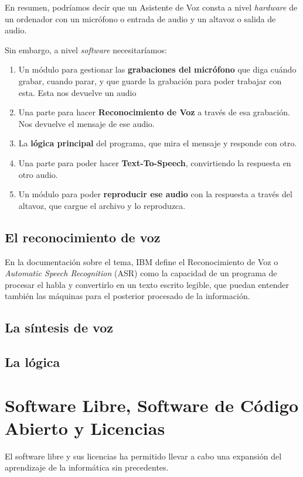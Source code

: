 En resumen, podríamos decir que un Asistente de Voz consta a nivel \textit{hardware} de un ordenador con un micrófono o entrada de audio y un altavoz o salida de audio.

Sin embargo, a nivel \textit{software} necesitaríamos:
\begin{enumerate}
	\item Un módulo para gestionar las \textbf{grabaciones del micrófono} que diga cuándo grabar, cuando parar, y que guarde la grabación para poder trabajar con esta. Esta nos devuelve un audio
	\item Una parte para hacer \textbf{Reconocimiento de Voz} a través de esa grabación. Nos devuelve el mensaje de ese audio.
	\item La \textbf{lógica principal} del programa, que mira el mensaje y responde con otro.
	\item Una parte para poder hacer \textbf{Text-To-Speech}, convirtiendo la respuesta en otro audio.
	\item Un módulo para poder \textbf{reproducir ese audio} con la respuesta a través del altavoz, que cargue el archivo y lo reproduzca.
\end{enumerate}

\subsection{El reconocimiento de voz}
En la documentación sobre el tema, IBM \cite{sr-definition} define el Reconocimiento de Voz o \textit{Automatic Speech Recognition} (ASR) como la capacidad de un programa de procesar el habla y convertirlo en un texto escrito legible, que puedan entender también las máquinas para el posterior procesado de la información.


\subsection{La síntesis de voz}

\subsection{La lógica}

\section{Software Libre, Software de Código Abierto y Licencias}
El software libre y sus licencias \cite{gplv3} ha permitido llevar a cabo una expansión del
aprendizaje de la informática sin precedentes.
